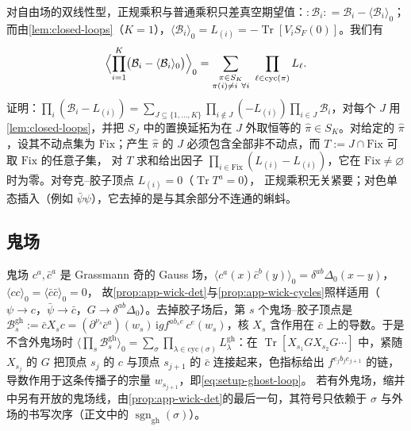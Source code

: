 \documentclass[UTF8,a4paper,11pt,fontset=fandol]{ctexart}
\theoremstyle{cplain}
\theoremstyle{cdefinition}
\theoremstyle{cremark}
\numberwithin{equation}{section}
\DeclareMathOperator{\Tr}{Tr}
\newcommand{\SF}{S_{F}}                              %
\newcommand{\ii}{\mathrm{i}}                        %
\begin{document}
对自由场的双线性型，正规乘积与普通乘积只差真空期望值：${:}\mathcal B_i{:}=\mathcal B_i-\langle\mathcal B_i\rangle_0$；而由\cref{lem:closed-loops}（$K=1$），$\langle\mathcal B_i\rangle_0=L_{(i)}=-\Tr[V_i\SF(0)]$。我们有
\begin{equation}\label{eq:app-wick-normal}
\Bigl\langle\prod_{i=1}^K\bigl(\mathcal B_i-\langle\mathcal B_i\rangle_0\bigr)\Bigr\rangle_0=\sum_{\substack{\pi\in S_K\\ \pi(i)\neq i\ \forall i}}\ \prod_{\ell\in\mathrm{cyc}(\pi)}L_\ell .
\end{equation}
证明：$\prod_i(\mathcal B_i-L_{(i)})=\sum_{J\subseteq\{1,\dots,K\}}\prod_{i\notin J}(-L_{(i)})\prod_{i\in J}\mathcal B_i$，对每个 $J$ 用\cref{lem:closed-loops}，并把 $S_J$ 中的置换延拓为在 $J$ 外取恒等的
$\hat\pi\in S_K$。对给定的 $\hat\pi$，设其不动点集为 $\mathrm{Fix}$；产生 $\hat\pi$ 的 $J$ 必须包含全部非不动点，而 $T:=J\cap\mathrm{Fix}$ 可取 $\mathrm{Fix}$ 的任意子集，
对 $T$ 求和给出因子 $\prod_{i\in\mathrm{Fix}}(L_{(i)}-L_{(i)})$，它在 $\mathrm{Fix}\neq\varnothing$ 时为零。对夸克--胶子顶点 $L_{(i)}=0$（$\Tr T^a=0$），
正规乘积无关紧要；对色单态插入（例如 $\bar\psi\psi$），它去掉的是与其余部分不连通的蝌蚪。

\subsection{鬼场}\label{app:wick-ghost}

鬼场 $c^a,\bar c^a$ 是 Grassmann 奇的 Gauss 场，$\langle c^a(x)\bar c^b(y)\rangle_0=\delta^{ab}\Delta_0(x-y)$，$\langle cc\rangle_0=\langle\bar c\bar c\rangle_0=0$，
故\cref{prop:app-wick-det}与\cref{prop:app-wick-cycles}照样适用（$\psi\to c$，$\bar\psi\to\bar c$，$G\to\delta^{ab}\Delta_0$）。去掉胶子场后，第 $s$ 个鬼场--胶子顶点是
$\mathcal B^{\mathrm{gh}}_s:=\bar cX_sc=(\partial^{\nu_s}\bar c^a)(w_s)\,\ii gf^{ab_se}\,c^e(w_s)$，核 $X_s$ 含作用在 $\bar c$ 上的导数。于是不含外鬼场时
$\langle\prod_s\mathcal B^{\mathrm{gh}}_s\rangle_0=\sum_{\sigma}\prod_{\lambda\in\mathrm{cyc}(\sigma)}L^{\mathrm{gh}}_\lambda$：在 $\Tr[X_{s_1}GX_{s_2}G\cdots]$ 中，紧随 $X_{s_j}$ 的 $G$
把顶点 $s_j$ 的 $c$ 与顶点 $s_{j+1}$ 的 $\bar c$ 连接起来，色指标给出 $f^{e_jb_je_{j+1}}$ 的链，导数作用于这条传播子的宗量 $w_{s_{j+1}}$，即\cref{eq:setup-ghost-loop}。
若有外鬼场，缩并中另有开放的鬼场线，由\cref{prop:app-wick-det}的最后一句，其符号只依赖于 $\sigma$ 与外场的书写次序（正文中的 $\operatorname{sgn}_{\mathrm{gh}}(\sigma)$）。
\end{document}

